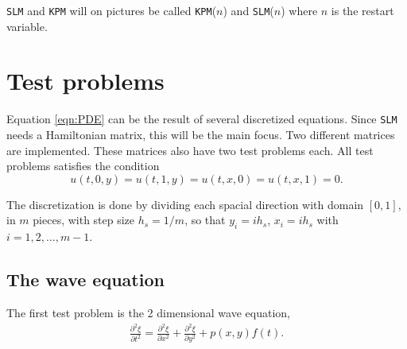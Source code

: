 \noindent \texttt{SLM} and \texttt{KPM} will on pictures be called \texttt{KPM}($n$) and \texttt{SLM}($n$) where $n$ is the restart variable.


\section{Test problems} %
\label{sec:testprob}
Equation \eqref{eqn:PDE} can be the result of several discretized equations. Since \texttt{SLM} needs a Hamiltonian matrix, this will be the main focus. Two different matrices are implemented. These matrices also have two test problems each. All test problems satisfies the condition $$u(t,0,y) = u(t,1,y) = u(t,x,0) = u(t,x,1) = 0.$$ 

\noindent The discretization is done by dividing each spacial direction with domain $[0,1]$, in $m$ pieces, with step size $h_s = 1/m$, so that $y_i = i h_s$, $x_i = i h_s$ with $i = 1,2,\dots,m-1 $. 

\subsection{The wave equation} %
The first test problem is the 2 dimensional wave equation, 
\begin{equation}
\begin{aligned}
\frac{\partial^2 \xi}{\partial t^2} = \frac{\partial^2 \xi}{\partial x^2}+ \frac{\partial^2 \xi}{\partial y^2} + p(x,y)f(t).
\end{aligned}
\label{eqn:wave}
\end{equation}

